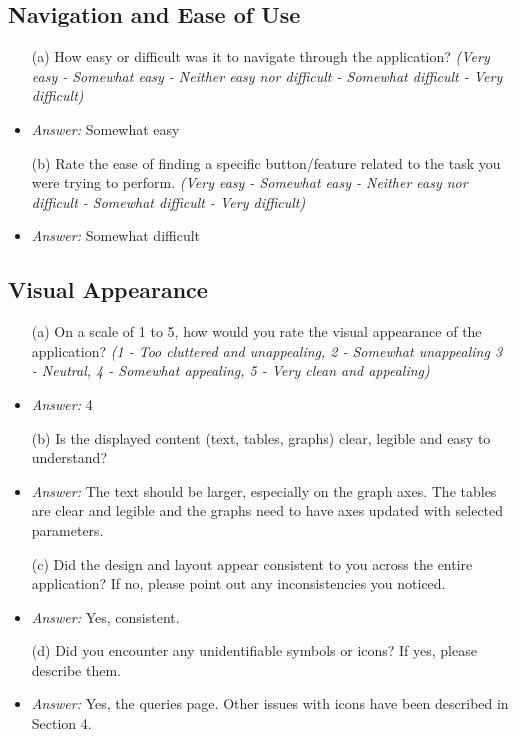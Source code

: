 \documentclass{article}
\begin{document}
\subsection*{\textbf{Navigation and Ease of Use}}
  \begin{itemize}
    \item[(a)] How easy or difficult was it to navigate through the
    application? \textit{(Very easy - Somewhat easy - Neither easy nor difficult
    - Somewhat difficult - Very difficult)}
    \item \emph{Answer:} Somewhat easy
    \item[(b)] Rate the ease of finding a specific button/feature related to the
    task you were trying to perform. \textit{(Very easy - Somewhat easy -
    Neither easy nor difficult - Somewhat difficult - Very difficult)}
    \item \emph{Answer:} Somewhat difficult
  \end{itemize}

\subsection*{\textbf{Visual Appearance}}
  \begin{itemize}
    \item[(a)] On a scale of 1 to 5, how would you rate the visual appearance of
    the application? \textit{(1 - Too cluttered and unappealing, 2 - Somewhat
    unappealing 3 - Neutral, 4 - Somewhat appealing, 5 - Very clean and
    appealing)}
    \item \emph{Answer:} 4
    \item[(b)] Is the displayed content (text, tables, graphs) clear, legible
    and easy to understand?
    \item \emph{Answer:} The text should be larger, especially on the graph axes. The tables are clear and 
    legible and the graphs need to have axes updated with selected parameters.
    \item[(c)] Did the design and layout appear consistent to you across
    the entire application? If no, please point out any inconsistencies you noticed.
    \item \emph{Answer:} Yes, consistent.
    \item[(d)] Did you encounter any unidentifiable symbols or icons? If yes,
    please describe them.
    \item \emph{Answer:} Yes, the queries page. Other issues with icons have been described in Section 4.
  \end{itemize}
\end{document}
